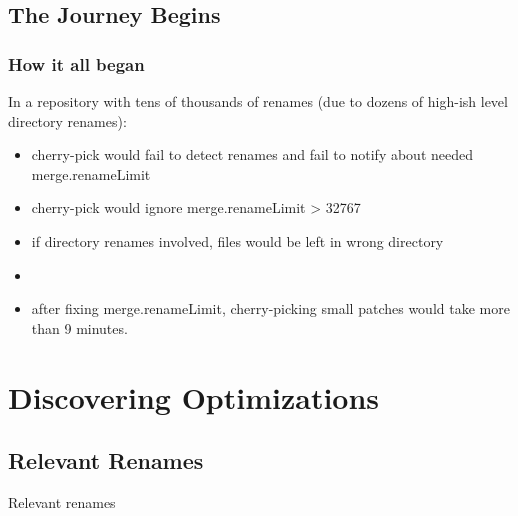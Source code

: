 \documentclass[compress,t]{beamer}
\begin{document}
\subsection{The Journey Begins}

\begin{frame}
  \frametitle{How it all began}

  In a repository with tens of thousands of renames (due to dozens of
  high-ish level directory renames):

  \begin{itemize}[<+(1)->]
    \item cherry-pick would fail to detect renames and fail to notify
          about needed merge.renameLimit
    \item cherry-pick would ignore merge.renameLimit > 32767
    \item if directory renames involved, files would be left in wrong
          directory
    \item {}
    \item after fixing merge.renameLimit, cherry-picking small patches
          would take more than 9 minutes.
  \end{itemize}

\end{frame}

\section{Discovering Optimizations}
\subsection[Relevance]{Relevant Renames}

\begin{frame}
  \vfill
  \vspace*{2\baselineskip}
  {\Huge
  \begin{center}Relevant renames\end{center}
  }
  \vfill
\end{frame}
\end{document}
